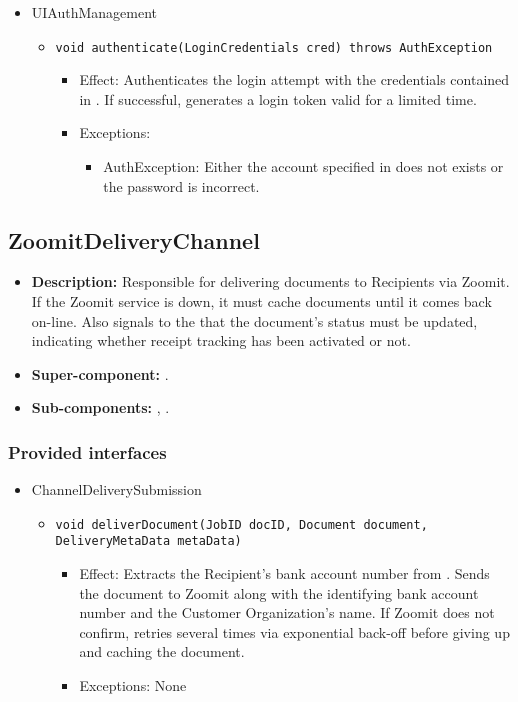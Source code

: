 \begin{itemize}
	\item UIAuthManagement
    \begin{itemize}
        \item \texttt{void authenticate(LoginCredentials cred) throws AuthException}
        \begin{itemize}
            \item Effect: Authenticates the login attempt with the credentials contained in . If successful, generates a login token valid for a limited time.
            \item Exceptions:
			\begin{itemize}
				\item AuthException: Either the account specified in  does not exists or the password is incorrect.
			\end{itemize}
        \end{itemize}
    \end{itemize}
\end{itemize}

\subsection{ZoomitDeliveryChannel}
\begin{itemize}
    \item \textbf{Description:} Responsible for delivering documents to Recipients via Zoomit. If the Zoomit service is down, it must cache documents until it comes back on-line. Also signals to the  that the document's status must be updated, indicating whether receipt tracking has been activated or not.
    \item \textbf{Super-component:} .
    \item \textbf{Sub-components:} , .
\end{itemize}

\subsubsection*{Provided interfaces}
\begin{itemize}
    \item ChannelDeliverySubmission
    \begin{itemize}
        \item \texttt{void deliverDocument(JobID docID, Document document, DeliveryMetaData metaData)}
        \begin{itemize}
            \item Effect: Extracts the Recipient's bank account number from . Sends the document to Zoomit along with the identifying bank account number and the Customer Organization's name. If Zoomit does not confirm, retries several times via exponential back-off before giving up and caching the document.
            \item Exceptions: None
        \end{itemize}
    \end{itemize}
\end{itemize}

